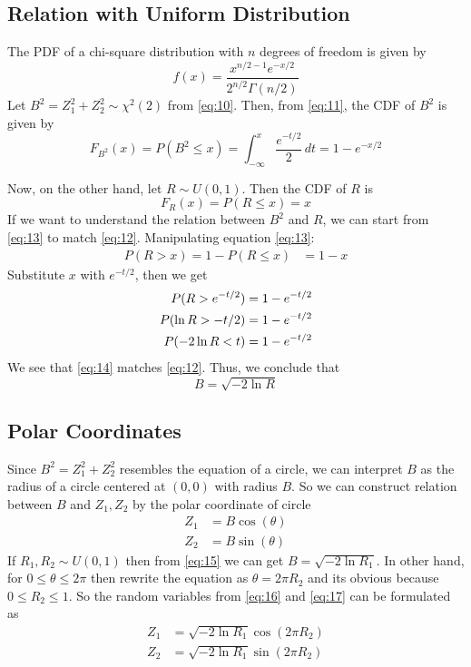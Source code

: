 \documentclass{article}
\begin{document}
\subsection*{Relation with Uniform Distribution}
The PDF of a chi-square distribution with \(n\) degrees of freedom is given by
\begin{equation}
    f(x) = \frac{x^{n/2 - 1} e^{-x/2}}{2^{n/2} \Gamma(n/2)}\label{eq:11}
\end{equation}
Let \(B^2 = Z_1^2 + Z_2^2 \sim \chi^2(2)\) from \eqref{eq:10}. Then, from \eqref{eq:11}, the CDF of \(B^2\) is given by
\begin{equation}
    F_{B^2}(x) = P(B^2 \leq x) = \int_{-\infty}^{x} \frac{e^{-t/2}}{2} \, dt = 1 - e^{-x/2} \label{eq:12}
\end{equation}

Now, on the other hand, let \(R \sim U(0,1)\). Then the CDF of \(R\) is
\begin{equation}
    F_R(x) = P(R \leq x) = x\label{eq:13}
\end{equation}
If we want to understand the relation between \(B^2\) and \(R\), we can start from \eqref{eq:13} to match \eqref{eq:12}. Manipulating equation \eqref{eq:13}:
\begin{align*}
    P(R > x) = 1 - P(R \leq x) &= 1 - x 
\end{align*}
Substitute \(x\) with \(e^{-t/2}\), then we get
\begin{align}
    P(R > e^{-t/2}) &= 1 - e^{-t/2}\notag\\
    P(\ln R > -t/2) &= 1 - e^{-t/2}\notag\\
    P(-2\ln R < t) &= 1 - e^{-t/2}\label{eq:14}
\end{align}
We see that \eqref{eq:14} matches \eqref{eq:12}. Thus, we conclude that
\begin{equation}
    B = \sqrt{-2\ln R} \label{eq:15}
\end{equation}

\subsection*{Polar Coordinates}
Since \(B^2 = Z_1^2 + Z_2^2\) resembles the equation of a circle, we can interpret \(B\) as the radius of a circle centered at \((0,0)\) with radius \(B\). So we can construct relation between $B$ and $Z_1,Z_2$ by the polar coordinate of circle
\begin{align}
    Z_1 &= B\cos(\theta)\label{eq:16}\\
    Z_2 &= B\sin(\theta)\label{eq:17}
\end{align}
If $R_1,R_2\sim U(0,1)$ then from \eqref{eq:15} we can get $B=\sqrt{-2\ln R_1}$. In other hand, for $0\leq \theta \leq 2\pi$ then rewrite the equation as $\theta=2\pi R_2$ and its obvious because $0\leq R_2\leq 1$. So the random variables from \eqref{eq:16} and \eqref{eq:17} can be formulated as
\begin{align}
    Z_1 &= \sqrt{-2\ln R_1}\cos(2\pi R_2)\label{eq:18}\\
    Z_2 &= \sqrt{-2\ln R_1}\sin(2\pi R_2)\label{eq:19}
\end{align}
\end{document}

